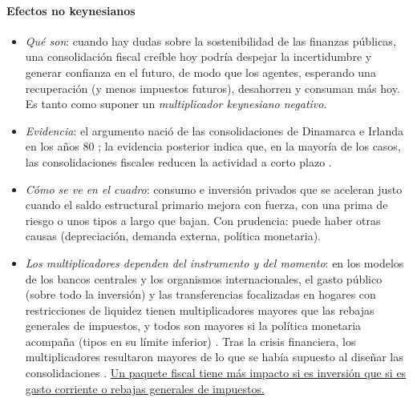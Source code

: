 \documentclass[11pt]{article}
\begin{document}
\paragraph{Efectos no keynesianos}
\begin{itemize}
\item \emph{Qué son}: cuando hay dudas sobre la sostenibilidad de las finanzas públicas, una consolidación fiscal creíble hoy podría despejar la incertidumbre y generar confianza en el futuro, de modo que los agentes, esperando una recuperación (y menos impuestos futuros), desahorren y consuman más hoy. Es tanto como suponer un \emph{multiplicador keynesiano negativo}.
\item \emph{Evidencia}: el argumento nació de las consolidaciones de Dinamarca e Irlanda en los años 80 \parencite{GiavazziPagano1990}; la evidencia posterior indica que, en la mayoría de los casos, las consolidaciones fiscales reducen la actividad a corto plazo \parencite{Guajardo2014Austeridad} .
\item \emph{Cómo se ve en el cuadro}: consumo e inversión privados que se aceleran justo cuando el saldo estructural primario mejora con fuerza, con una prima de riesgo o unos tipos a largo que bajan. Con prudencia: puede haber otras causas (depreciación, demanda externa, política monetaria).
\item \emph{Los multiplicadores dependen del instrumento y del momento}: en los modelos de los bancos centrales y los organismos internacionales, el gasto público (sobre todo la inversión) y las transferencias focalizadas en hogares con restricciones de liquidez tienen multiplicadores mayores que las rebajas generales de impuestos, y todos son mayores si la política monetaria acompaña (tipos en su límite inferior) \parencite{Coenen2012Multiplicadores}. Tras la crisis financiera, los multiplicadores resultaron mayores de lo que se había supuesto al diseñar las consolidaciones \parencite{BlanchardLeigh2013Growth}. \uline{Un paquete fiscal tiene más impacto si es inversión que si es gasto corriente o rebajas generales de impuestos.}
\end{itemize}
\end{document}
